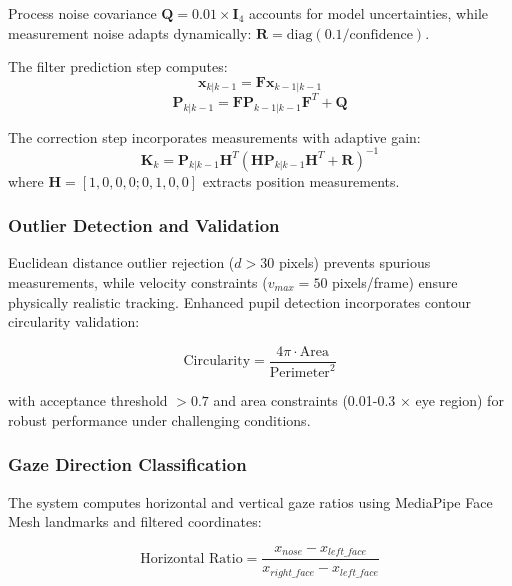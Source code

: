 \documentclass[conference]{IEEEtran}
\begin{document}
Process noise covariance $\mathbf{Q} = 0.01 \times \mathbf{I}_4$ accounts for model 
uncertainties, while measurement noise adapts dynamically: 
$\mathbf{R} = \text{diag}(0.1/\text{confidence})$. 

The filter prediction step computes:
\begin{equation}
\mathbf{x}_{k|k-1} = \mathbf{F}\mathbf{x}_{k-1|k-1}
\end{equation}
\begin{equation}
\mathbf{P}_{k|k-1} = \mathbf{F}\mathbf{P}_{k-1|k-1}\mathbf{F}^T + \mathbf{Q}
\end{equation}

The correction step incorporates measurements with adaptive gain:
\begin{equation}
\mathbf{K}_k = \mathbf{P}_{k|k-1}\mathbf{H}^T(\mathbf{H}\mathbf{P}_{k|k-1}\mathbf{H}^T + \mathbf{R})^{-1}
\end{equation}
where $\mathbf{H} = [1, 0, 0, 0; 0, 1, 0, 0]$ extracts position measurements.

\subsubsection{Outlier Detection and Validation}

Euclidean distance outlier rejection ($d > 30$ pixels) prevents spurious measurements, 
while velocity constraints ($v_{max} = 50$ pixels/frame) ensure physically realistic 
tracking. Enhanced pupil detection incorporates contour circularity validation:

\begin{equation}
\text{Circularity} = \frac{4\pi \cdot \text{Area}}{\text{Perimeter}^2}
\end{equation}

with acceptance threshold $> 0.7$ and area constraints (0.01-0.3 × eye region) for 
robust performance under challenging conditions\cite{li2003survey}.

\subsubsection{Gaze Direction Classification}

The system computes horizontal and vertical gaze ratios using MediaPipe Face Mesh 
landmarks and filtered coordinates:

\begin{equation}
\text{Horizontal Ratio} = \frac{x_{nose} - x_{left\_face}}{x_{right\_face} - x_{left\_face}}
\end{equation}
\end{document}
